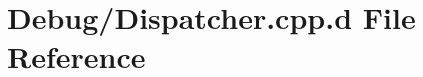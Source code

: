 \hypertarget{_debug_2_dispatcher_8cpp_8d}{\section{\-Debug/\-Dispatcher.cpp.\-d \-File \-Reference}
\label{_debug_2_dispatcher_8cpp_8d}
}
